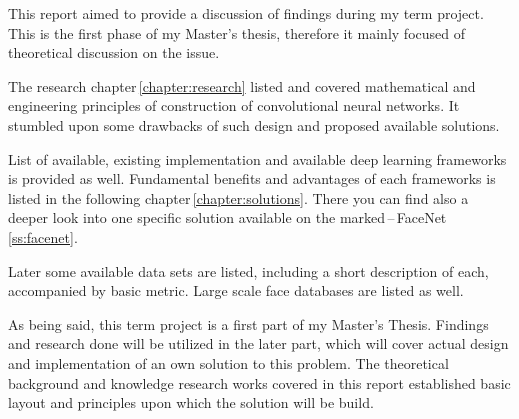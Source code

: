 This report aimed to provide a discussion of findings during my term project. This is the first phase of my Master's thesis, therefore it mainly focused of theoretical discussion on the issue.

The research chapter\,\ref{chapter:research} listed and covered mathematical and engineering principles of construction of convolutional neural networks. It stumbled upon some drawbacks of such design and proposed available solutions.

List of available, existing implementation and available deep learning frameworks is provided as well. Fundamental benefits and advantages of each frameworks is listed in the following chapter\,\ref{chapter:solutions}. There you can find also a deeper look into one specific solution available on the marked\,--\,FaceNet\,\ref{ss:facenet}.

Later some available data sets are listed, including a short description of each, accompanied by basic metric. Large scale face databases are listed as well.

As being said, this term project is a first part of my Master's Thesis. Findings and research done will be utilized in the later part, which will cover actual design and implementation of an own solution to this problem. The theoretical background and knowledge research works covered in this report established basic layout and principles upon which the solution will be build.

